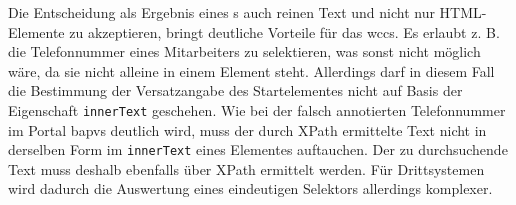     Die Entscheidung als Ergebnis eines {\xpathSelector}s auch reinen Text und nicht nur
    HTML-Elemente zu akzeptieren, bringt deutliche Vorteile für das \gls{wccs}.
    Es erlaubt z. B. die Telefonnummer eines Mitarbeiters zu selektieren,
    was sonst nicht möglich wäre, da sie nicht alleine in einem Element steht.
    Allerdings darf in diesem Fall die Bestimmung der Versatzangabe des Startelementes nicht auf
    Basis der Eigenschaft \texttt{innerText} geschehen.
    Wie bei der falsch annotierten Telefonnummer im Portal \gls{bapvs} deutlich
    wird,
    muss der durch XPath ermittelte Text nicht in derselben Form im \texttt{innerText} eines Elementes auftauchen.
    Der zu durchsuchende Text muss deshalb ebenfalls über XPath ermittelt werden.
    Für Drittsystemen wird dadurch die Auswertung eines eindeutigen Selektors allerdings komplexer.
